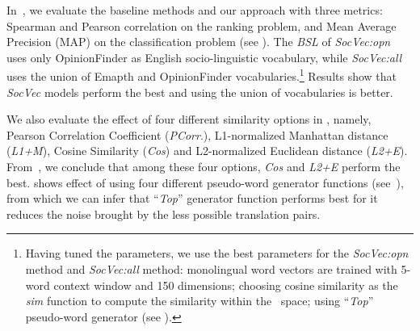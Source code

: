 In~, we evaluate the baseline methods and 
our approach with three metrics: Spearman and 
Pearson correlation on the ranking problem, and Mean Average Precision (MAP)
on the classification problem (see ). The \textit{BSL} of \textit{SocVec:opn} uses only OpinionFinder as English socio-linguistic vocabulary, while \textit{SocVec:all} uses the union of Emapth and OpinionFinder vocabularies.\footnote{
Having tuned the  parameters, we use the best parameters for the \textit{SocVec:opn} method and \textit{SocVec:all} method: 
monolingual word vectors are trained with 5-word context window and 150 dimensions;
choosing cosine similarity as the \textit{sim} function to compute the similarity within the \textit{\socvec}~space;
using ``\textit{Top}'' pseudo-word generator
(see ).
} Results show that \textit{SocVec} models perform the best and 
using the union of vocabularies is better.

We also evaluate the effect of four different similarity options in 
\textit{\socvec}, namely, Pearson Correlation Coefficient 
(\textit{PCorr}.), L1-normalized Manhattan distance (\textit{L1+M}), 
Cosine Similarity (\textit{Cos}) and  L2-normalized Euclidean distance (\textit{L2+E}).
From~, we conclude that among these four options, \textit{Cos} and \textit{L2+E} perform the best. 
 shows effect of using four different 
pseudo-word generator functions (see~), from which we can infer that ``\textit{Top}'' generator function performs best for 
it reduces the noise brought by the less possible translation pairs. 

